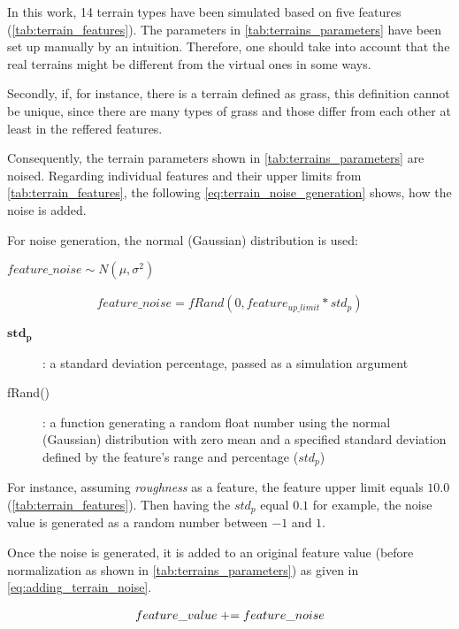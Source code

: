 In this work, 14 terrain types have been simulated based on five features (\cref{tab:terrain_features}). The parameters in \cref{tab:terrains_parameters} have been set up manually by an intuition. Therefore, one should take into account that the real terrains might be different from the virtual ones in some ways.

Secondly, if, for instance, there is a terrain defined as grass, this definition cannot be unique, since there are many types of grass and those differ from each other at least in the reffered features.

Consequently, the terrain parameters shown in \cref{tab:terrains_parameters} are noised. Regarding individual features and their upper limits from \cref{tab:terrain_features}, the following \cref{eq:terrain_noise_generation} shows, how the noise is added.

For noise generation, the normal (Gaussian) distribution is used: 
\begin{center}
$ feature\_noise \sim N(\mu, \sigma^2) $
\end{center}

\begin{align} \label{eq:terrain_noise_generation}
feature\_noise = fRand(0, feature_{up\_limit}*std_p)
\end{align}

\begin{description}
\item[$ \boldsymbol{std_p} $] : a standard deviation percentage, passed as a simulation argument
\item[fRand()] : a function generating a random float number using the normal (Gaussian) distribution with zero mean and a specified standard deviation defined by the feature's range and percentage ($ std_p $)
\end{description}

For instance, assuming \textit{roughness} as a feature, the feature upper limit equals $ 10.0 $ (\cref{tab:terrain_features}). Then having the $ std_p $ equal $ 0.1 $ for example, the noise value is generated as a random number between $ -1 $ and $ 1 $.

Once the noise is generated, it is added to an original feature value (before normalization as shown in \cref{tab:terrains_parameters}) as given in \cref{eq:adding_terrain_noise}.

\begin{align} \label{eq:adding_terrain_noise}
feature\_value \mathrel{+}= feature\_noise
\end{align}

